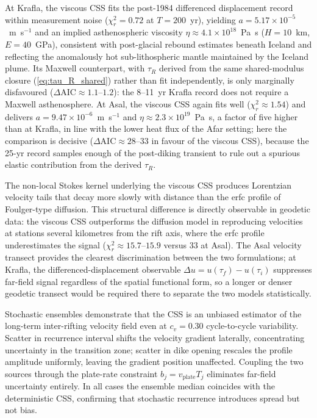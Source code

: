 \documentclass[extra]{gji}
\begin{document}
At Krafla, the viscous CSS fits the post-1984 differenced displacement
record within measurement noise ($\chi^2_r = 0.72$ at $T = 200$~yr),
yielding $a = 5.17\times10^{-5}$~m~s$^{-1}$ and an implied asthenospheric
viscosity $\eta \approx 4.1\times10^{18}$~Pa~s ($H = 10$~km, $E = 40$~GPa),
consistent with post-glacial rebound estimates beneath Iceland and
reflecting the anomalously hot sub-lithospheric mantle maintained by the
Iceland plume.  Its Maxwell counterpart, with $\tau_R$ derived from the
same shared-modulus closure (\ref{eq:tau_R_shared}) rather than fit
independently, is only marginally disfavoured
($\Delta\mathrm{AIC} \approx 1.1$--$1.2$): the 8--11~yr Krafla record does
not require a Maxwell asthenosphere.  At Asal, the viscous CSS again fits
well ($\chi^2_r \approx 1.54$) and delivers $a = 9.47\times10^{-6}$~m~s$^{-1}$
and $\eta \approx 2.3\times10^{19}$~Pa~s, a factor of five higher than at
Krafla, in line with the lower heat flux of the Afar setting; here the
comparison is decisive ($\Delta\mathrm{AIC} \approx 28$--$33$ in favour of
the viscous CSS), because the 25-yr record samples enough of the
post-diking transient to rule out a spurious elastic contribution from the
derived $\tau_R$.

The non-local Stokes kernel underlying the viscous CSS produces Lorentzian
velocity tails that decay more slowly with distance than the erfc profile
of Foulger-type diffusion.  This structural difference is directly
observable in geodetic data: the viscous CSS outperforms the diffusion
model in reproducing velocities at stations several kilometres from the
rift axis, where the erfc profile underestimates the signal
($\chi^2_r \approx 15.7$--$15.9$ versus $33$ at Asal).  The Asal velocity
transect provides the clearest discrimination between the two
formulations; at Krafla, the differenced-displacement observable
$\Delta u = u(\tau_f) - u(\tau_i)$ suppresses far-field signal regardless
of the spatial functional form, so a longer or denser geodetic transect
would be required there to separate the two models statistically.

Stochastic ensembles demonstrate that the CSS is an unbiased estimator of
the long-term inter-rifting velocity field even at $c_v = 0.30$
cycle-to-cycle variability.  Scatter in recurrence interval shifts the
velocity gradient laterally, concentrating uncertainty in the transition
zone; scatter in dike opening rescales the profile amplitude uniformly,
leaving the gradient position unaffected.  Coupling the two sources through
the plate-rate constraint $b_j = v_{\mathrm{plate}} T_j$ eliminates
far-field uncertainty entirely.  In all cases the ensemble median coincides
with the deterministic CSS, confirming that stochastic recurrence introduces
spread but not bias.
\end{document}
